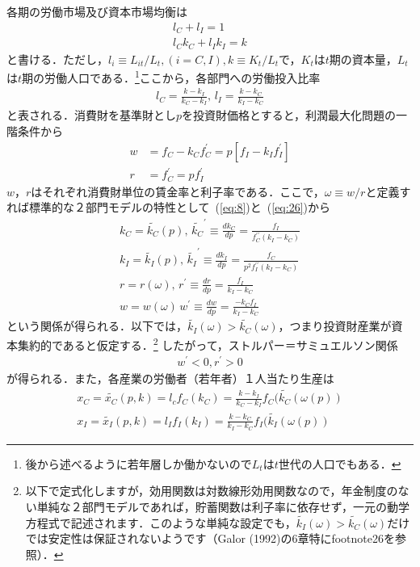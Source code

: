 \documentclass[12pt,a4paper]{jsarticle}
\begin{document}
各期の労働市場及び資本市場均衡は
\begin{align}
 l_{C} +  l_{I} =1 \\
 l_{C} k_{C}+  l_{I} k_{I}= k
\end{align}
と書ける．ただし，$l_{i} \equiv L_{it}/L_{t},  (i = C,I), k \equiv K_{t}/L_{t}$で，$K_{t}$は$t$期の資本量，$L_{t}$は$t$期の労働人口である．\footnote{
後から述べるように若年層しか働かないので$L_{t}$は$t$世代の人口でもある．
}ここから，各部門への労働投入比率
\begin{align}
 l_{C} = \frac{k-k_{I}}{k_{C}-k_{I}}, \,  l_{I} = \frac{k-k_{C}}{k_{I}-k_{C}}
\end{align}
と表される．消費財を基準財とし$p$を投資財価格とすると，利潤最大化問題の一階条件から
\begin{align}
 w &= f_{C} - k_{C} f_{C}^{\prime} = p \left[f_{I} - k_{I} f_{I}^{\prime} \right]  \label{eq:8}\\
r &= f_{C}^{\prime} =  p f_{I}^{\prime} \label{eq:26}
\end{align}
$w$，$r$はそれぞれ消費財単位の賃金率と利子率である．ここで，$\omega \equiv w/r$と定義すれば標準的な２部門モデルの特性として~(\ref{eq:8})と~(\ref{eq:26})から
\begin{align}
 k_{C} =\tilde{k_{C}}(p),  \, \tilde{k_{C}}^{\prime} \equiv \frac{d k_{C}}{dp} = \frac{f_{I}}{f_{C}^{\prime \prime} (k_{I} -k_{C})} \\
 k_{I} =\tilde{k_{I}}(p),  \, \tilde{k_{I}}^{\prime} \equiv \frac{d k_{I}}{dp} = \frac{f_{C}}{p^{2}f_{I}^{\prime \prime} (k_{I} -k_{C})} \\
 r =r(\omega), \, r^{\prime} \equiv \frac{dr}{dp} = \frac{f_{I}}{k_{I} -k_{C}} \\
 w = w(\omega) \, w^{\prime} \equiv  \frac{dw}{dp} = \frac{ -k_{C}  f_{I}} {k_{I} -k_{C}}\label{eq:17}
\end{align}
という関係が得られる．以下では，$\tilde{k_{I}}(\omega) > \tilde{k_{C}}(\omega)$，つまり投資財産業が資本集約的であると仮定する．\footnote{以下で定式化しますが，効用関数は対数線形効用関数なので，年金制度のない単純な２部門モデルであれば，貯蓄関数は利子率に依存せず，一元の動学方程式で記述されます．このような単純な設定でも，$\tilde{k_{I}}(\omega) > \tilde{k_{C}}(\omega)$だけでは安定性は保証されないようです（Galor (1992)の6章特にfootnote26を参照）．}
したがって，ストルパー＝サミュエルソン関係
\begin{align}
w^\prime <0, r^{\prime}>0 \label{eq:7}
\end{align}
が得られる．また，各産業の労働者（若年者）１人当たり生産は
\begin{align}
 x_{C} = \tilde{ x_{C}}(p, k) = l_{c}f_{C}(k_{C}) = \frac{k-k_{I}}{k_{C}-k_{I}} f_{C}(\tilde{k_{C}}(\omega(p))  \label{eq:11}\\
x_{I} = \tilde{ x_{I}}(p, k) = l_{I}f_{I}(k_{I}) = \frac{k -k_{C}}{k_{I}-k_{C}} f_{I}(\tilde{k_{I}}(\omega(p)) \label{eq:12}
\end{align}
\end{document}
